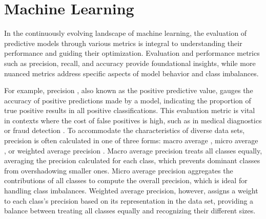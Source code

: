 \documentclass{article}
\begin{document}




\clearpage




\section{Machine Learning}

In the continuously evolving landscape of machine learning, the evaluation of predictive models through various metrics is integral to understanding their performance and guiding their optimization. Evaluation and performance metrics such as precision, recall, and accuracy provide foundational insights, while more nuanced metrics address specific aspects of model behavior and class imbalances.

For example, precision \cite{altman1994statistics, fletcher2019clinical}, also known as the positive predictive value, gauges the accuracy of positive predictions made by a model, indicating the proportion of true positive results in all positive classifications. This evaluation metric is vital in contexts where the cost of false positives is high, such as in medical diagnostics \cite{kononenko2001machine, ahsan2022machine} or fraud detection \cite{ashtiani2021intelligent, ali2022financial}. To accommodate the characteristics of diverse data sets, precision is often calculated in one of three forms: macro average \cite{yang1999evaluation, sebastiani2002machine, zhu2004recall, he2018local}, micro average \cite{yang1999evaluation, sebastiani2002machine}, or weighted average precision \cite{han2014rule}. Macro average precision treats all classes equally, averaging the precision calculated for each class, which prevents dominant classes from overshadowing smaller ones. Micro average precision aggregates the contributions of all classes to compute the overall precision, which is ideal for handling class imbalances. Weighted average precision, however, assigns a weight to each class's precision based on its representation in the data set, providing a balance between treating all classes equally and recognizing their different sizes.
\end{document}
